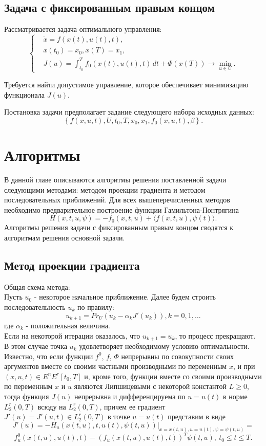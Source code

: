 \documentclass[oneside,final,12pt]{extreport}
\begin{document}
\section{Задача с фиксированным правым концом}
 
Рассматривается задача оптимального управления:
$$ \left\{\begin{aligned} & \dot x=f(x(t),u(t),t), \\ & x(t_0)=x_0, x(T)=x_1, \\ & J(u)=\int_{t_0}^T f_0(x(t),u(t),t) \, dt+ \Phi(x(T))\rightarrow \min_{u \in U}. \end{aligned}\right. $$
 
Требуется найти допустимое управление, которое обеспечивает минимизацию функционала $J(u)$.
 
Постановка задачи предполагает задание следующего набора исходных данных:
$$\left\{f(x,u,t),U,t_0,T,x_0,x_1,f_0(x,u,t),\beta\right\}.$$
 
\chapter{Алгоритмы}
В данной главе описываются алгоритмы решения поставленной задачи следующими методами: методом проекции градиента и методом последовательных приближений. Для всех вышеперечисленных методов необходимо предварительное построение функции Гамильтона-Понтрягина
$$H(x,t,u,\psi)=-f_0(x,t,u)+\langle f(x,t,u),\psi(t)\rangle.$$
Алгоритмы решения задачи с фиксированным правым концом сводятся к алгоритмам решения основной задачи.
 
\section{Метод проекции градиента} 
Общая схема метода:\\
Пусть $u_0$ - некоторое начальное приближение. Далее будем строить последовательность ${u_k}$ по правилу:
$$ u_{k+1}=Pr_U(u_k-\alpha_kJ'(u_k)), k=0,1,\dots$$
где $\alpha_k$ - положительная величина.\\
Если на некоторой итерации оказалось, что $u_{k+1}=u_k$, то процесс прекращают. В этом случае точка $u_k$ удовлетворяет необходимому условию оптимальности.\\
Известно, что если функции $f^0$, $f$, $\Phi$ непрерывны по совокупности своих аргументов вместе со своими частными производными по переменным $x$, и при $(x,u,t)\in E^n E^r[t_0, T]$ и, кроме того, функции вместе со своими производными по переменным $x$ и $u$ являются Липшицевыми с некоторой 
константой $L \geqslant 0$, 
тогда функция $J(u)$ непрерывна и 
дифференцируема по $u=u(t)$ в норме $L^{r}_2(0, T)$ всюду на $L^{r}_2(0, T)$, 
причем ее градиент $J'(u)=J'(u,t) \in L^{r}_2(0, T)$ в точке $u=u(t)$ представим в виде
$$J'(u)=-H_u(x(t,u),t,u(t),\psi(t,u))|_{x=x(t,u),u=u(t),\psi=\psi(t,u)}=$$ 
$$f^0_u(x(t,u),u(t),t)-(f_u(x(t,u),u(t),t))^T\psi(t,u), \ t_0 \leqslant t \leqslant T.$$
\end{document}
